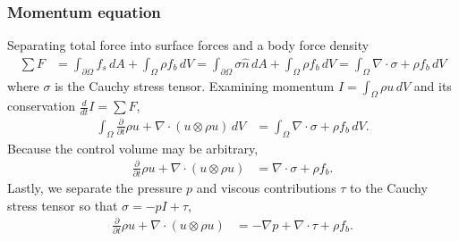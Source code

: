 \documentclass[letterpaper,11pt,nointlimits,reqno]{amsart}
\begin{document}
\subsubsection{Momentum equation}
Separating total force into surface forces and a body force density
\begin{align}
  \sum{}F
  &=
     \int_{\partial\Omega} f_s \, dA
   + \int_{\Omega} \rho{}f_b \, dV
  =
     \int_{\partial\Omega} \sigma \hat{n} \, dA
  +  \int_{\Omega} \rho{}f_b \, dV
  =  \int_{\Omega} \nabla\cdot\sigma + \rho{} f_b \, dV
\end{align}
where $\sigma$ is the Cauchy stress tensor.  Examining
momentum $I=\int_{\Omega} \rho{}u\,dV$ and its conservation
$\frac{d}{dt}I=\sum{}F$,
\begin{align}
    \int_{\Omega}\frac{\partial{}}{\partial{}t}\rho{}u
  + \nabla\cdot(u\otimes{}\rho{}u)\,dV
&= \int_{\Omega} \nabla\cdot\sigma + \rho{} f_b \, dV
.
\end{align}
Because the control volume may be arbitrary,
\begin{align}
  \frac{\partial{}}{\partial{}t}\rho{}u + \nabla\cdot(u\otimes{}\rho{}u)
&= \nabla\cdot\sigma + \rho{} f_b
.
\end{align}
Lastly, we separate the pressure $p$ and viscous contributions $\tau$ to
the Cauchy stress tensor so that $\sigma = -p I + \tau$,
\begin{align}
\label{eq:cons_momentum}
\frac{\partial{}}{\partial{}t}\rho{}u + \nabla\cdot(u\otimes{}\rho{}u)
&= -\nabla{}p + \nabla\cdot{}\tau + \rho{} f_b
.
\end{align}
\end{document}
